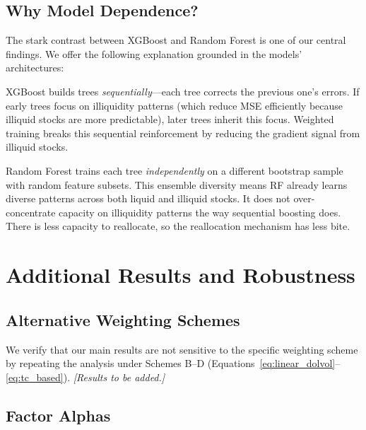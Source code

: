 \documentclass[a4paper,12pt,final]{article}
\begin{document}
\subsection{Why Model Dependence?}
\label{subsec:model_dependence}

The stark contrast between XGBoost and Random Forest is one of our central findings. We offer the following explanation grounded in the models' architectures:

XGBoost builds trees \emph{sequentially}---each tree corrects the previous one's errors. If early trees focus on illiquidity patterns (which reduce MSE efficiently because illiquid stocks are more predictable), later trees inherit this focus. Weighted training breaks this sequential reinforcement by reducing the gradient signal from illiquid stocks.

Random Forest trains each tree \emph{independently} on a different bootstrap sample with random feature subsets. This ensemble diversity means RF already learns diverse patterns across both liquid and illiquid stocks. It does not over-concentrate capacity on illiquidity patterns the way sequential boosting does. There is less capacity to reallocate, so the reallocation mechanism has less bite.


\section{Additional Results and Robustness}
\label{sec:robustness}

\subsection{Alternative Weighting Schemes}
\label{subsec:alt_weights}

We verify that our main results are not sensitive to the specific weighting scheme by repeating the analysis under Schemes B--D (Equations~\ref{eq:linear_dolvol}--\ref{eq:tc_based}). \emph{[Results to be added.]}

\subsection{Factor Alphas}
\label{subsec:factor_alphas}

% 
\end{document}
